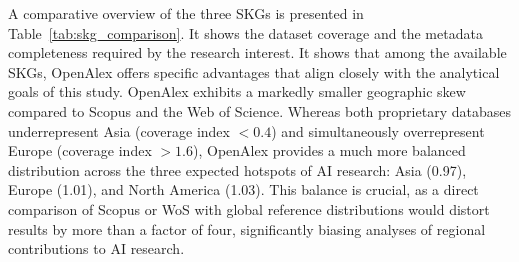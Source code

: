 \documentclass{article}
\begin{document}
A comparative overview of the three SKGs is presented in Table~\ref{tab:skg_comparison}.  It shows the dataset coverage and the metadata completeness required by the research interest. It shows that among the available SKGs, OpenAlex offers specific advantages that align closely with the analytical goals of this study. OpenAlex exhibits a markedly smaller geographic skew compared to Scopus and the Web of Science. Whereas both proprietary databases underrepresent Asia (coverage index $<0.4$) and simultaneously overrepresent Europe (coverage index $>1.6$), OpenAlex provides a much more balanced distribution across the three expected hotspots of AI research: Asia (0.97), Europe (1.01), and North America (1.03). \cite{Maddi2025GeographicalDisciplinaryCoverage} This balance is crucial, as a direct comparison of Scopus or WoS with global reference distributions would distort results by more than a factor of four, significantly biasing analyses of regional contributions to AI research.
\end{document}

